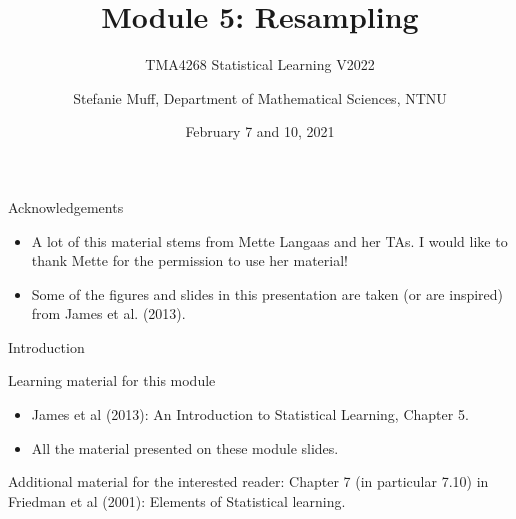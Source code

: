 \documentclass[10pt,ignorenonframetext,]{beamer}
\title{Module 5: Resampling}
\subtitle{TMA4268 Statistical Learning V2022}
\author{Stefanie Muff, Department of Mathematical Sciences, NTNU}
\date{February 7 and 10, 2021}
\begin{document}
\frame{\titlepage}

\begin{frame}{Acknowledgements}
\protect\hypertarget{acknowledgements}{}

\begin{itemize}
\item
  A lot of this material stems from Mette Langaas and her TAs. I would
  like to thank Mette for the permission to use her material!
\item
  Some of the figures and slides in this presentation are taken (or are
  inspired) from James et al. (2013).
\end{itemize}

\end{frame}

\begin{frame}{Introduction}
\protect\hypertarget{introduction}{}

\begin{block}{Learning material for this module}

\vspace{2mm}

\begin{itemize}
\item
  James et al (2013): An Introduction to Statistical Learning, Chapter
  5.
\item
  All the material presented on these module slides.
\end{itemize}

\vspace{2mm}

Additional material for the interested reader: Chapter 7 (in particular
7.10) in Friedman et al (2001): Elements of Statistical learning.

\end{block}

\end{frame}
\end{document}

